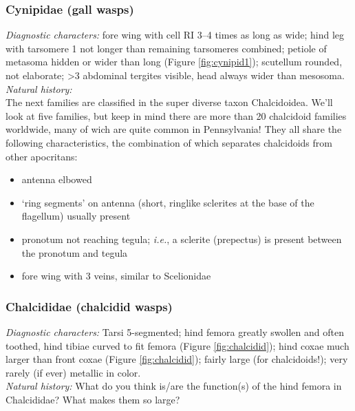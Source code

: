 \documentclass[letterpaper, 11pt]{article}
\begin{document}
\subsubsection{Cynipidae (gall wasps)}
\noindent{}\textit{Diagnostic characters:} fore wing with cell RI 3--4 times as long as wide; hind leg with tarsomere 1 not longer than remaining tarsomeres combined; petiole of metasoma hidden or wider than long (Figure \ref{fig:cynipid1}); scutellum rounded, not elaborate; \textgreater{}3 abdominal tergites visible, head always wider than mesosoma.\\

\noindent{}\textit{Natural history:} \\

\noindent{}The next families are classified in the super diverse taxon Chalcidoidea. We'll look at five families, but keep in mind there are more than 20 chalcidoid families worldwide, many of wich are quite common in Pennsylvania! They all share the following characteristics, the combination of which separates chalcidoids from other apocritans:
\begin{itemize}
\item antenna elbowed
\item `ring segments' on antenna (short, ringlike sclerites at the base of the flagellum) usually present
\item pronotum not reaching tegula; \textit{i.e.}, a sclerite (prepectus) is present between the pronotum and tegula 
\item fore wing with 3 veins, similar to Scelionidae
\end{itemize}

\subsubsection{Chalcididae (chalcidid wasps)}
\noindent{}\textit{Diagnostic characters:} Tarsi 5-segmented; hind femora greatly swollen and often toothed, hind tibiae curved to fit femora (Figure \ref{fig:chalcidid}); hind coxae much larger than front coxae (Figure \ref{fig:chalcidid}); fairly large (for chalcidoids!); very rarely (if ever) metallic in color.\\

\noindent{}\textit{Natural history:} What do you think is/are the function(s) of the hind femora in Chalcididae? What makes them so large?\\
\end{document}
